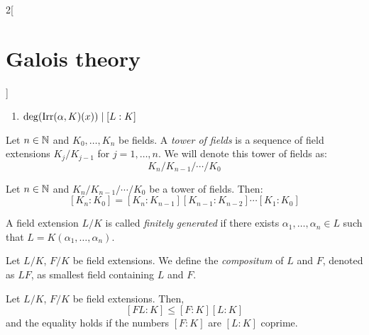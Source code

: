 \documentclass[../../../main_math.tex]{subfiles}
\begin{document}
\begin{multicols}{2}[\section{Galois theory}]
\begin{proposition}
\begin{enumerate}
      \item $\deg(\operatorname{Irr}(\alpha,K)(x))\mid [L:K]$
    \end{enumerate}
  \end{proposition}
  \begin{definition}
    Let $n\in\mathbb{N}$ and $K_0,\ldots,K_n$ be fields. A \emph{tower of fields} is a sequence of field extensions $K_j/K_{j-1}$ for $j=1,\ldots,n$. We will denote this tower of fields as: $$K_n/K_{n-1}/\cdots/K_0$$
  \end{definition}
  \begin{corollary}
    Let $n\in\mathbb{N}$ and $K_n/K_{n-1}/\cdots/K_0$ be a tower of fields. Then: $$[K_n:K_0]=[K_n:K_{n-1}][K_{n-1}:K_{n-2}]\cdots[K_1:K_0]$$
  \end{corollary}
  \begin{definition}
    A field extension $L/K$ is called \emph{finitely generated} if there exists $\alpha_1,\ldots,\alpha_n\in L$ such that $L=K(\alpha_1,\ldots,\alpha_n)$.
  \end{definition}
  \begin{definition}
    Let $L/K$, $F/K$ be field extensions. We define the \emph{compositum} of $L$ and $F$, denoted as $LF$, as smallest field containing $L$ and $F$.
  \end{definition}
  \begin{proposition}
    Let $L/K$, $F/K$ be field extensions. Then, $$[FL:K]\leq[F:K][L:K]$$ and the equality holds if the numbers $[F:K]$ are $[L:K]$ coprime.
  \end{proposition}

\end{multicols}
\end{document}
